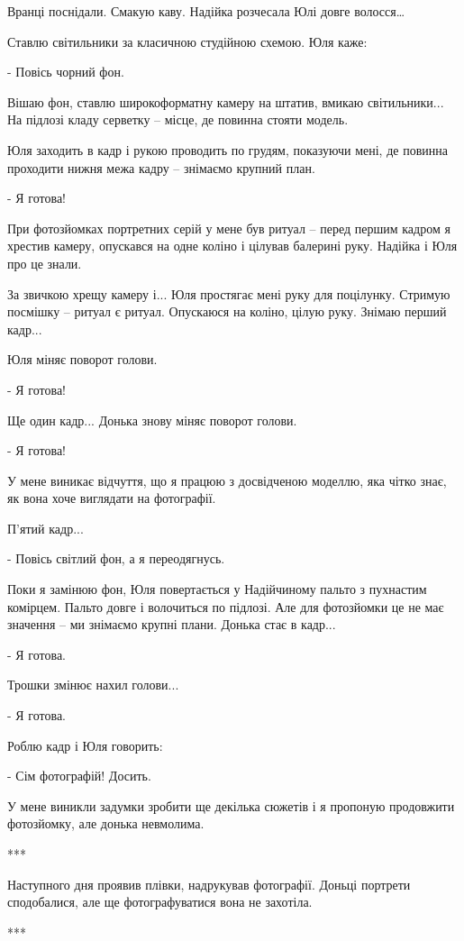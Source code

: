 Вранці поснідали. Смакую каву. Надійка розчесала Юлі довге волосся…

Ставлю світильники за класичною студійною схемою. Юля каже:

- Повісь чорний фон. 

Вішаю фон, ставлю широкоформатну камеру на штатив, вмикаю світильники... На
підлозі кладу серветку – місце, де повинна стояти модель.


Юля заходить в кадр і рукою проводить по грудям, показуючи мені, де повинна
проходити нижня межа кадру – знімаємо крупний план. 

- Я готова!

При фотозйомках портретних серій у мене був ритуал – перед першим кадром я
хрестив камеру, опускався на одне коліно і цілував балерині руку. Надійка і Юля
про це знали. 

За звичкою хрещу камеру і... Юля простягає мені руку для поцілунку. Стримую
посмішку – ритуал є ритуал. Опускаюся на коліно, цілую руку. Знімаю перший
кадр... 

Юля міняє поворот голови.

- Я готова!

Ще один кадр... Донька знову міняє поворот голови.

- Я готова!

У мене виникає відчуття, що я працюю з досвідченою моделлю, яка чітко знає, як
вона хоче виглядати на фотографії. 

П’ятий кадр...

- Повісь світлий фон, а я переодягнусь.

Поки я замінюю фон, Юля повертається у Надійчиному пальто з пухнастим комірцем.
Пальто довге і волочиться по підлозі. Але для фотозйомки це не має значення –
ми знімаємо крупні плани. Донька стає в кадр...

- Я готова.

Трошки змінює нахил голови...

- Я готова.

Роблю кадр і Юля говорить:

- Сім фотографій! Досить. 

У мене виникли задумки зробити ще декілька сюжетів і я пропоную продовжити
фотозйомку, але донька невмолима. 

***

Наступного дня проявив плівки, надрукував фотографії. Доньці портрети
сподобалися, але ще фотографуватися вона не захотіла. 

***

